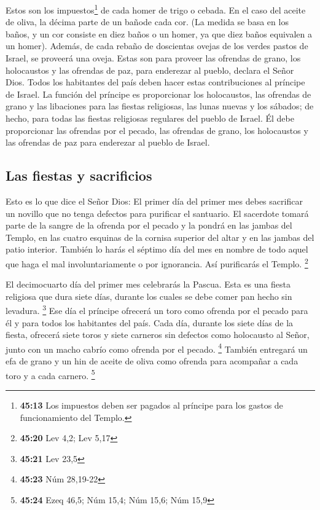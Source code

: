  Estos son los impuestos\footnote{\textbf{45:13} Los
  impuestos deben ser pagados al príncipe para los gastos de
  funcionamiento del Templo.} de cada homer de trigo o cebada.
 En el caso del aceite de oliva, la décima parte de un
bañode cada cor. (La medida se basa en los baños, y un cor consiste en
diez baños o un homer, ya que diez baños equivalen a un homer).
 Además, de cada rebaño de doscientas ovejas de los
verdes pastos de Israel, se proveerá una oveja. Estas son para proveer
las ofrendas de grano, los holocaustos y las ofrendas de paz, para
enderezar al pueblo, declara el Señor Dios.  Todos los
habitantes del país deben hacer estas contribuciones al príncipe de
Israel.  La función del príncipe es proporcionar los
holocaustos, las ofrendas de grano y las libaciones para las fiestas
religiosas, las lunas nuevas y los sábados; de hecho, para todas las
fiestas religiosas regulares del pueblo de Israel. Él debe proporcionar
las ofrendas por el pecado, las ofrendas de grano, los holocaustos y las
ofrendas de paz para enderezar al pueblo de Israel.

\hypertarget{las-fiestas-y-sacrificios}{%
\subsection{Las fiestas y sacrificios}\label{las-fiestas-y-sacrificios}}

 Esto es lo que dice el Señor Dios: El primer día del
primer mes debes sacrificar un novillo que no tenga defectos para
purificar el santuario.  El sacerdote tomará parte de la
sangre de la ofrenda por el pecado y la pondrá en las jambas del Templo,
en las cuatro esquinas de la cornisa superior del altar y en las jambas
del patio interior.  También lo harás el séptimo día del
mes en nombre de todo aquel que haga el mal involuntariamente o por
ignorancia. Así purificarás el Templo. \footnote{\textbf{45:20} Lev 4,2;
  Lev 5,17}

 El decimocuarto día del primer mes celebrarás la Pascua.
Esta es una fiesta religiosa que dura siete días, durante los cuales se
debe comer pan hecho sin levadura. \footnote{\textbf{45:21} Lev 23,5}
 Ese día el príncipe ofrecerá un toro como ofrenda por el
pecado para él y para todos los habitantes del país. 
Cada día, durante los siete días de la fiesta, ofrecerá siete toros y
siete carneros sin defectos como holocausto al Señor, junto con un macho
cabrío como ofrenda por el pecado. \footnote{\textbf{45:23} Núm 28,19-22}
 También entregará un efa de grano y un hin de aceite de
oliva como ofrenda para acompañar a cada toro y a cada carnero.
\footnote{\textbf{45:24} Ezeq 46,5; Núm 15,4; Núm 15,6; Núm 15,9}

